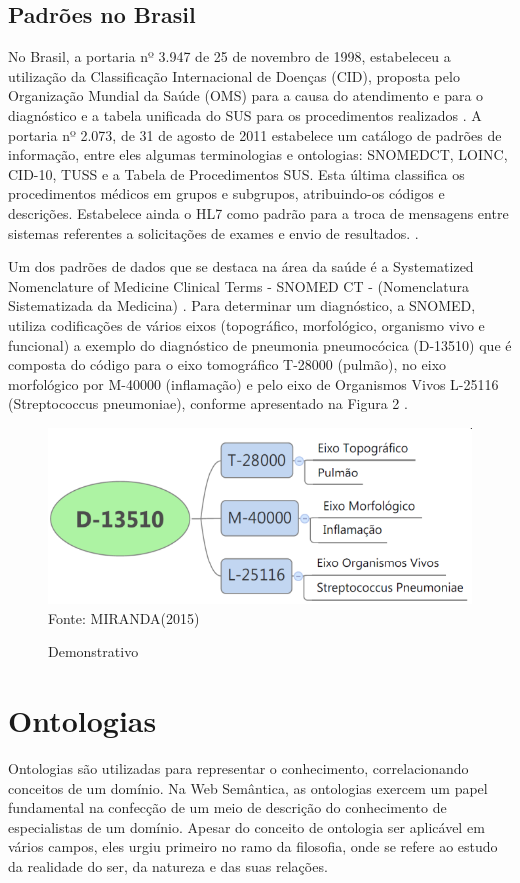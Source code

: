 \subsection{Padrões no Brasil}
No Brasil, a portaria nº 3.947 de 25 de novembro de 1998, estabeleceu  a utilização da Classificação Internacional
de Doenças (CID), proposta pelo Organização Mundial da Saúde (OMS) para a causa do atendimento e para o diagnóstico e a tabela
unificada do SUS para os procedimentos realizados \cite{BRASIL1998}.
A portaria nº 2.073, de 31 de agosto de 2011 estabelece um catálogo de padrões de informação, entre eles algumas terminologias e ontologias: SNOMEDCT,
LOINC, CID-10, TUSS e a Tabela de Procedimentos SUS. Esta última classifica os procedimentos médicos em grupos e subgrupos, atribuindo-os códigos e descrições. Estabelece ainda o HL7 como padrão para a troca de mensagens entre sistemas referentes a solicitações de exames e envio de resultados. \cite{BRASIL2011}.

Um dos padrões de dados que se destaca na área da saúde é a Systematized Nomenclature of Medicine Clinical Terms - SNOMED CT - (Nomenclatura Sistematizada da Medicina) \cite{BARRA}. Para determinar um diagnóstico, a SNOMED, utiliza
codificações de vários eixos (topográfico, morfológico, organismo vivo e funcional) a exemplo do diagnóstico de pneumonia pneumocócica (D-13510)  que é composta do código para o eixo tomográfico T-28000 (pulmão), no eixo morfológico por M-40000 (inflamação) e pelo eixo de Organismos Vivos L-25116 (Streptococcus pneumoniae), conforme apresentado na Figura 2 \cite{MIRANDA} .

\begin{figure}[htbp]
    	\centering
        \caption{Demonstrativo}
        \label{fig:exemplo-snomed.png}
        \includegraphics[width=1\linewidth]{exemplo-snomed.png}
        Fonte: MIRANDA(2015)
\end{figure}

\section{Ontologias}
Ontologias são utilizadas para representar o conhecimento, correlacionando conceitos de um domínio. Na Web Semântica, as ontologias exercem um papel fundamental na confecção de um meio de descrição do conhecimento de especialistas de um domínio. Apesar do conceito de ontologia ser aplicável em vários campos, eles urgiu primeiro no ramo da filosofia, onde se refere ao estudo da realidade do ser, da natureza e das suas relações.\cite{HOFWEBER}


